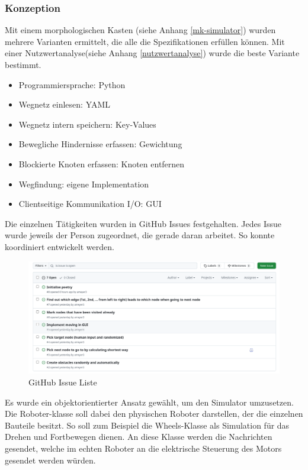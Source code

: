 \subsubsection{Konzeption}

Mit einem morphologischen Kasten (siehe Anhang \ref{mk-simulator}) wurden mehrere Varianten ermittelt, die alle die Spezifikationen erfüllen können. Mit einer Nutzwertanalyse(siehe Anhang \ref{nutzwertanalyse}) wurde die beste Variante bestimmt.

\begin{itemize}
    \item Programmiersprache: Python
    \item Wegnetz einlesen: YAML
    \item Wegnetz intern speichern: Key-Values
    \item Bewegliche Hindernisse erfassen: Gewichtung
    \item Blockierte Knoten erfassen: Knoten entfernen
    \item Wegfindung: eigene Implementation
    \item Clientseitige Kommunikation I/O: GUI
\end{itemize}

Die einzelnen Tätigkeiten wurden in GitHub Issues festgehalten. Jedes Issue wurde jeweils der Person zugeordnet, die gerade daran arbeitet. So konnte koordiniert entwickelt werden.

\begin{figure}[H]
\centering
\includegraphics[width=\textwidth]{img/github-issues.png}
\caption{GitHub Issue Liste}
\label{fig:github-issues}
\end{figure}

Es wurde ein objektorientierter Ansatz gewählt, um den Simulator umzusetzen. Die Roboter-klasse soll dabei den physischen Roboter darstellen, der die einzelnen Bauteile besitzt. So soll zum Beispiel die Wheels-Klasse als Simulation für das Drehen und Fortbewegen dienen. An diese Klasse werden die Nachrichten gesendet, welche im echten Roboter an die elektrische Steuerung des Motors gesendet werden würden.

